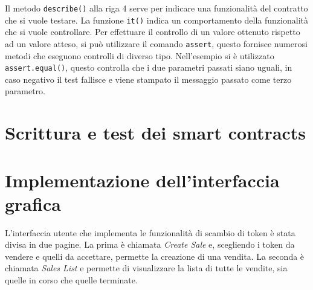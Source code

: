\documentclass[a4paper]{article}
\begin{document}
        Il metodo \verb|describe()| alla riga 4 serve per indicare una funzionalità del contratto che si vuole testare.
        La funzione \verb|it()| indica un comportamento della funzionalità che si vuole controllare.
        \newline
        Per effettuare il controllo di un valore ottenuto rispetto ad un valore atteso, si può utilizzare il comando \verb|assert|, questo fornisce numerosi metodi che eseguono controlli di diverso tipo.
        Nell'esempio si è utilizzato \verb|assert.equal()|, questo controlla che i due parametri passati siano uguali, in caso negativo il test fallisce e viene stampato il messaggio passato come terzo parametro.
        \newpage

        \section{Scrittura e test dei smart contracts}
        \newpage

        \section{Implementazione dell'interfaccia grafica}
        L'interfaccia utente che implementa le funzionalità di scambio di token è stata divisa in due pagine.
        La prima è chiamata \emph{Create Sale} e, scegliendo i token da vendere e quelli da accettare, permette
        la creazione di una vendita. La seconda è chiamata \emph{Sales List} e permette di visualizzare la lista di tutte le vendite, sia quelle in corso
        che quelle terminate.
\end{document}
